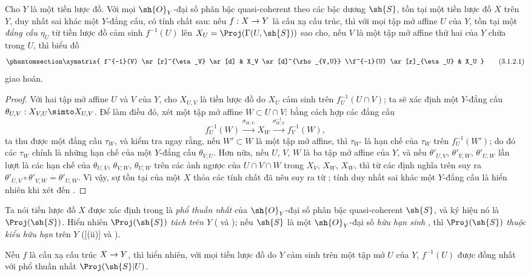 \documentclass[oneside,10pt]{amsart}
\makeatletter
\newcommand{\ega@arrow}[2]{\mathchoice{#1}{#2}{#2}{#2}}
\renewcommand{\to}{\ega@arrow{\longrightarrow}{\rightarrow}}
\let\EGAOriginalLabel\label
\renewcommand{\label}[1]{\phantomsection\EGAOriginalLabel{#1}}
\makeatother
\begin{document}
\begin{proposition}[3.1.2]
\label{II.3.1.2}
Cho $Y$ là một tiền lược đồ.
Với mọi $\sh{O}_Y$-đại số phân bậc quasi-coherent theo các bậc dương $\sh{S}$, tồn tại một tiền lược đồ $X$ trên $Y$, duy nhất sai khác một $Y$-đẳng cấu, có tính chất sau:
nếu $f:X\to Y$ là cấu xạ cấu trúc, thì với mọi tập mở affine $U$ của $Y$, tồn tại một \emph{đẳng cấu} $\eta_U$ từ tiền lược đồ cảm sinh $f^{-1}(U)$ lên $X_U=\Proj(\Gamma(U,\sh{S}))$ sao cho, nếu $V$ là một tập mở affine thứ hai của $Y$ chứa trong $U$, thì biểu đồ
\[
\label{II.3.1.2.1}
  \xymatrix{
    f^{-1}(V) \ar[r]^{\eta_V} \ar[d]
    & X_V \ar[d]^{\rho_{V,U}}
  \\f^{-1}(U) \ar[r]_{\eta_U}
    & X_U
  }
\tag{3.1.2.1}
\]
giao hoán.
\end{proposition}

\begin{proof}
Với hai tập mở affine $U$ và $V$ của $Y$, cho $X_{U,V}$ là tiền lược đồ do $X_U$ cảm sinh trên $f_U^{-1}(U\cap V)$;
ta sẽ xác định một $Y$-đẳng cấu $\theta_{U,V}:X_{V,U}\simto X_{U,V}$.
Để làm điều đó, xét một tập mở affine $W\subset U\cap V$:
bằng cách hợp các đẳng cấu
\[
  f_U^{-1}(W)
  \xrightarrow{\sigma_{W,U}} X_W
  \xrightarrow{\sigma_{W,V}^{-1}} f_V^{-1}(W),
\]
ta thu được một đẳng cấu $\tau_W$, và kiểm tra ngay rằng, nếu $W'\subset W$ là một tập mở affine, thì $\tau_{W'}$ là hạn chế của $\tau_W$ trên $f_U^{-1}(W')$;
do đó các $\tau_W$ chính là những hạn chế của một $Y$-đẳng cấu $\theta_{V,U}$.
Hơn nữa, nếu $U$, $V$, $W$ là ba tập mở affine của $Y$, và nếu $\theta'_{U,V}$, $\theta'_{V,W}$, $\theta'_{U,W}$ lần lượt là các hạn chế của $\theta_{U,V}$, $\theta_{V,W}$, $\theta_{U,W}$ trên các ảnh ngược của $U\cap V\cap W$ trong $X_V$, $X_W$, $X_W$, thì từ các định nghĩa trên suy ra $\theta'_{U,V}\circ\theta'_{V,W}=\theta'_{U,W}$.
Vì vậy, sự tồn tại của một $X$ thỏa các tính chất đã nêu suy ra từ ;
tính duy nhất sai khác một $Y$-đẳng cấu là hiển nhiên khi xét đến .
\end{proof}

\begin{env}[3.1.3]
\label{II.3.1.3}
Ta nói tiền lược đồ $X$ được xác định trong  là \emph{phổ thuần nhất} của $\sh{O}_Y$-đại số phân bậc quasi-coherent $\sh{S}$, và ký hiệu nó là $\Proj(\sh{S})$.
Hiển nhiên $\Proj(\sh{S})$ \emph{tách trên $Y$} ( và );
nếu $\sh{S}$ là một $\sh{O}_Y$-đại số \emph{hữu hạn sinh} , thì $\Proj(\sh{S})$ \emph{thuộc kiểu hữu hạn} trên $Y$ ([(ii)] và ).

Nếu $f$ là cấu xạ cấu trúc $X\to Y$, thì hiển nhiên, với mọi tiền lược đồ do $Y$ cảm sinh trên một tập mở $U$ của $Y$, $f^{-1}(U)$ được đồng nhất với phổ thuần nhất $\Proj(\sh{S}|U)$.
\end{env}
\end{document}

